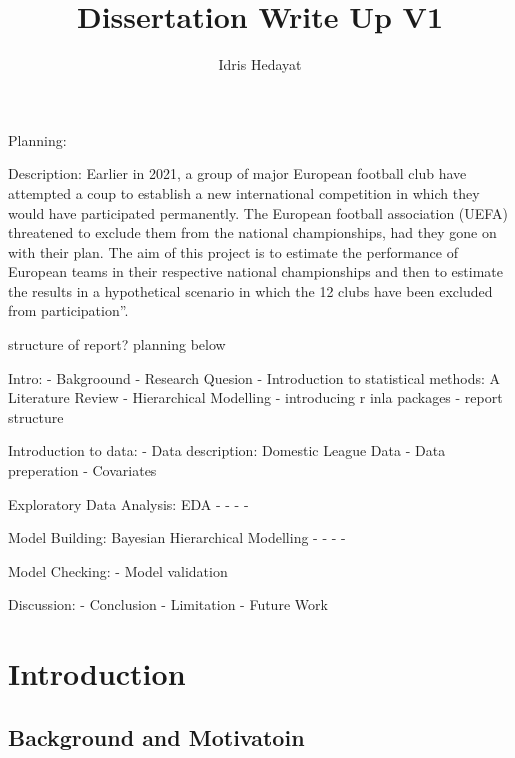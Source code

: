 \documentclass[
]{article}
\title{Dissertation Write Up V1}
\author{Idris Hedayat}
\date{}
\begin{document}
\maketitle

Planning:

Description: Earlier in 2021, a group of major European football club
have attempted a coup to establish a new international competition in
which they would have participated permanently. The European football
association (UEFA) threatened to exclude them from the national
championships, had they gone on with their plan. The aim of this project
is to estimate the performance of European teams in their respective
national championships and then to estimate the results in a
hypothetical scenario in which the 12 clubs have been excluded from
participation''.

structure of report? planning below

Intro: - Bakgroound - Research Quesion - Introduction to statistical
methods: A Literature Review - Hierarchical Modelling - introducing r
inla packages - report structure

Introduction to data: - Data description: Domestic League Data - Data
preperation - Covariates

Exploratory Data Analysis: EDA - - - -

Model Building: Bayesian Hierarchical Modelling - - - -

Model Checking: - Model validation

Discussion: - Conclusion - Limitation - Future Work

\hypertarget{introduction}{%
\section{Introduction}\label{introduction}}

\hypertarget{background-and-motivatoin}{%
\subsection{Background and Motivatoin}\label{background-and-motivatoin}}
\end{document}
